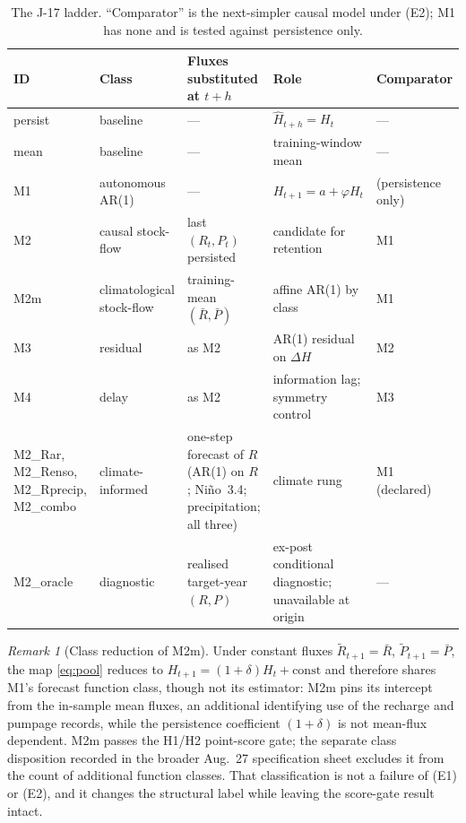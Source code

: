 \documentclass[preprint,11pt,authoryear]{elsarticle}
\theoremstyle{definition}
\theoremstyle{remark}
\newtheorem{remark}{Remark}
\begin{document}
\begin{table}[!htb]
\centering\small
\caption{The J-17 ladder. ``Comparator'' is the next-simpler causal model under (E2); M1 has none and is tested against persistence only.}
\label{tab:edwladder}
\begin{tabularx}{\textwidth}{@{}>{\raggedright\arraybackslash}p{}>{\raggedright\arraybackslash}p{}>{\raggedright\arraybackslash}p{}L>{\raggedright\arraybackslash}p{0.14\textwidth}@{}}
\toprule
ID & Class & Fluxes substituted at $t+h$ & Role & Comparator \\
\midrule
persist & baseline & --- & $\hat H_{t+h}=H_t$ & --- \\
mean & baseline & --- & training-window mean & --- \\
M1 & autonomous AR(1) & --- & $H_{t+1}=a+\varphi H_t$ & (persistence only) \\
M2 & causal stock-flow & last $(R_t,P_t)$ persisted & candidate for retention & M1 \\
M2m & climatological stock-flow & training-mean $(\bar R,\bar P)$ & affine AR(1) by class & M1 \\
M3 & residual & as M2 & AR(1) residual on $\Delta H$ & M2 \\
M4 & delay & as M2 & information lag; symmetry control & M3 \\
M2\_Rar, M2\_Renso, M2\_Rprecip, M2\_combo & climate-informed & one-step forecast of $R$ (AR(1) on $R$; Ni\~no~3.4; precipitation; all three) & climate rung & M1 (declared) \\
M2\_oracle & diagnostic & realised target-year $(R,P)$ & ex-post conditional diagnostic; unavailable at origin & --- \\
\bottomrule
\end{tabularx}
\end{table}

\begin{remark}[Class reduction of M2m]\label{rem:class}
Under constant fluxes $\tilde R_{t+1}=\bar R$, $\tilde P_{t+1}=\bar P$, the map \eqref{eq:pool} reduces to $H_{t+1}=(1+\delta)H_t+\mathrm{const}$ and therefore shares M1's forecast function class, though not its estimator: M2m pins its intercept from the in-sample mean fluxes, an additional identifying use of the recharge and pumpage records, while the persistence coefficient $(1+\delta)$ is not mean-flux dependent. M2m passes the H1/H2 point-score gate; the separate class disposition recorded in the broader Aug.\ 27 specification sheet excludes it from the count of additional function classes. That classification is not a failure of (E1) or (E2), and it changes the structural label while leaving the score-gate result intact.
\end{remark}
\end{document}

